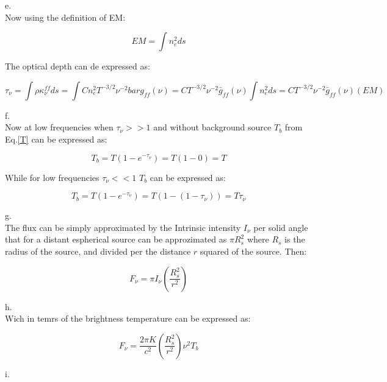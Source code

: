 \documentclass[12pt]{article}
\begin{document}
e.\\ 

Now using the definition of EM:

\begin{equation}
EM = \int n_e^2 ds
\end{equation}

The optical depth can de expressed as:

\begin{equation}
\tau_{\nu} = \int \rho \kappa_{\nu}^{ff} ds = 
\int C n_e^2 T^{-3/2}\nu^{-2}bar{g}_{ff}(\nu)
=  C T^{-3/2}\nu^{-2}\bar{g}_{ff}(\nu) \int n_e^2 ds 
= C T^{-3/2}\nu^{-2}\bar{g}_{ff}(\nu) (EM)
\end{equation}

f.\\

Now at low frequencies when $\tau_{\nu}>>1$ and without background source $T_b$
from Eq.\ref{T} can be expressed as: 

\begin{equation}
T_b = T(1-e^{-\tau_{\nu}}) = T(1 - 0) = T
\end{equation}


While for low frequencies $\tau_{\nu}<<1$ $T_b$ can be expressed as:

\begin{equation}
T_b = T(1-e^{-\tau_{\nu}}) = T(1 -(1- \tau_{\nu})) = T\tau_{\nu}
\end{equation}

g.\\

The flux can be simply approximated by the Intrinsic intensity $I_{\nu}$
per solid angle that for a distant espherical source can be approzimated 
as $\pi R_s^2$ where $R_s$ is the radius of the source, and divided per 
the distance $r$ squared of the source. Then:

\begin{equation}
F_{\nu} = \pi I_{\nu} \left( \dfrac{R_s^2}{r^2}\right) 
\end{equation}
 
h.\\

Wich in temrs of the brightness temperature can be expressed as:

\begin{equation}
F_{\nu} = \dfrac{2\pi K}{c^2} \left( \dfrac{R_s^2}{r^2}\right)  \nu^2 T_{b}
\end{equation}

i.\\
\end{document}
